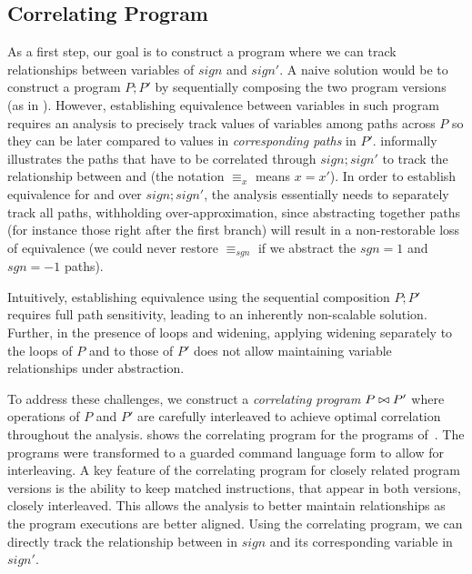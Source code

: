 \subsection{Correlating Program}
As a first step, our goal is to construct a program where we can track relationships between variables of $sign$ and $sign'$. A naive solution would be to construct a program $P;P'$ by sequentially composing the two program versions (as in \cite{EnglerRamos11,GodlinStrichman09}). However, establishing equivalence between variables in such program requires an analysis to precisely track values of variables among paths across $P$ so they can be later compared to values in \emph{corresponding paths} in $P'$.  informally illustrates the paths that have to be correlated through $sign;sign'$ to track the relationship between  and  (the notation $\equiv_{x}$ means $x=x'$). In order to establish equivalence for  and  over $sign;sign'$, the analysis essentially needs to separately track all paths, withholding over-approximation, since abstracting together paths (for instance those right after the first branch) will result in a non-restorable loss of equivalence (we could never restore $\equiv_{sgn}$ if we abstract the $sgn=1$ and $sgn=-1$ paths).

Intuitively, establishing equivalence using the sequential composition $P;P'$ requires full path sensitivity, leading to an inherently non-scalable solution. Further, in the presence of loops and widening, applying widening separately to the loops of $P$ and to those of $P'$ does not allow maintaining variable relationships under abstraction.

To address these challenges, we construct a \emph{correlating program} $P \bowtie P'$ where operations of $P$ and $P'$ are carefully interleaved to achieve optimal correlation throughout the analysis.  shows the correlating program for the programs of~. The programs were transformed to a guarded command language form to allow for interleaving. A key feature of the correlating program for closely related program versions is the ability to keep matched instructions, that appear in both versions, closely interleaved. This allows the analysis to better maintain relationships as the program executions are better aligned. Using the correlating program, we can directly track the relationship between  in $sign$ and its corresponding variable  in $sign'$.

